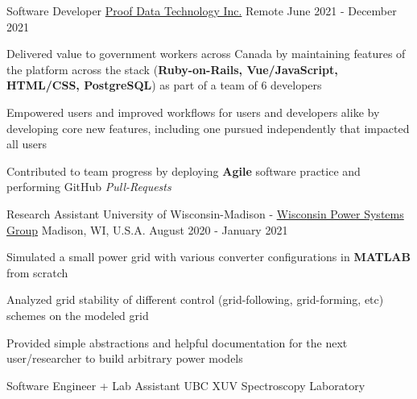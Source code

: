 \begin{cventries}
  \cventry
    {Software Developer}
    {\href{https://proofgov.com/}{Proof Data Technology Inc.}}
    {Remote}
    {June 2021 - December 2021}
    {
      \begin{cvitems}
            \item Delivered value to government workers across Canada by maintaining features of the platform across the stack (\textbf{Ruby-on-Rails, Vue/JavaScript, HTML/CSS, PostgreSQL}) as part of a team of 6 developers
            \item Empowered users and improved workflows for users and developers alike by developing core new features, including one pursued independently that impacted all users
            \item Contributed to team progress by deploying \textbf{Agile} software practice and performing GitHub \emph{Pull-Requests}
      \end{cvitems}
    }
  \cventry
    {Research Assistant}
    {University of Wisconsin-Madison - \href{https://wispo.ece.wisc.edu/}{Wisconsin Power Systems Group}}
    {Madison, WI, U.S.A.}
    {August 2020 - January 2021}
    {
      \begin{cvitems}
        \item Simulated a small power grid with various converter configurations in \textbf{MATLAB} from scratch
        \item Analyzed grid stability of different control (grid-following, grid-forming, etc) schemes on the modeled grid
        \item Provided simple abstractions and helpful documentation for the next user/researcher to build arbitrary power models
      \end{cvitems}
    }
  \iftoggle{resume}{}{
  \cventry
    {Undergraduate Summer Student}
    {\href{https://perimeterinstitute.ca/}{Perimeter Institute for Theoretical Physics}}
    {Waterloo, ON, Canada}
    {May 2017 - Aug. 2017}
    {
      \begin{cvitems}
        \item {Selected along with 6 others amongst 100+ students to perform summer research at the Institute.}
        \item {Upgraded supervisor's \textbf{C}-program, SSMC, that uses a sub-stochastic Markov process to solve MAX-SAT problems by reducing solve-times for hard instances.}
      \end{cvitems}
    }}
  \cventry
    {Software Engineer + Lab Assistant}
    {UBC XUV Spectroscopy Laboratory}

\end{cventries}

